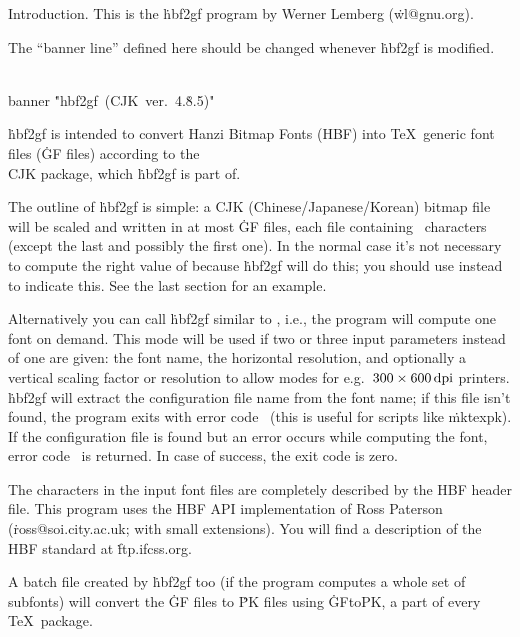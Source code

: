 \def\msdos{\.{msdos}}





Introduction.
This is the \.{hbf2gf} program by Werner Lemberg
(\.{wl@gnu.org}).

The ``banner line'' defined here should be changed whenever \.{hbf2gf} is
modified.

\Y\B\4\D\\{banner}\5
\.{"hbf2gf\ (CJK\ ver.\ 4.}\)\.{8.5)"}\par
\fi

\.{hbf2gf} is intended to convert Hanzi Bitmap Fonts (HBF) into \TeX\
generic font files (\.{GF} files) according to the \\{CJK} package, which
\.{hbf2gf} is part of.

The outline of \.{hbf2gf} is simple: a CJK (Chinese/Japanese/Korean) bitmap
file will be scaled and written in at most \PB{\\{nmb\_files}} \.{GF} files,
each
file containing ~characters (except the last and possibly the first
one). In the normal case it's not necessary to compute the right value of
\PB{\\{nmb\_files}} because \.{hbf2gf} will do this; you should use \PB{${-}%
\T{1}$} instead to
indicate this. See the last section for an example.

Alternatively you can call \.{hbf2gf} similar to \mf, i.e., the program will
compute one font on demand. This mode will be used if two or three input
parameters instead of one are given: the font name, the horizontal
resolution, and optionally a vertical scaling factor or resolution to allow
modes for e.g.\ $300\times600\,\hbox{dpi}$ printers. \.{hbf2gf} will extract
the configuration file name from the font name; if this file isn't found,
the program exits with error code~\PB{\T{2}} (this is useful for scripts like
\.{mktexpk}). If the configuration file is found but an error occurs while
computing the font, error code~\PB{\T{1}} is returned. In case of success, the
exit
code is zero.

The characters in the input font files are completely described by the HBF
header file. This program uses the HBF API implementation of Ross Paterson
(\.{ross@soi.city.ac.uk}; with small extensions). You will find a
description of the HBF standard at \.{ftp.ifcss.org}.

A batch file created by \.{hbf2gf} too (if the program computes a whole set
of subfonts) will convert the \.{GF} files to \.{PK} files using
\.{GFtoPK}, a part of every \TeX\ package.

